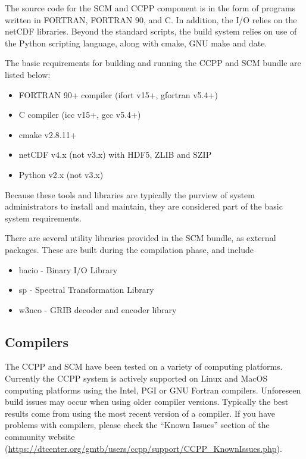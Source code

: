 The source code for the SCM and CCPP component is in the form of programs written in FORTRAN, FORTRAN 90, and C. In addition, the I/O relies on the netCDF libraries. Beyond the standard scripts, the build system relies on use of the Python scripting language, along with cmake, GNU make and date.

The basic requirements for building and running the CCPP and SCM bundle are listed below:
\begin{itemize}
    \item FORTRAN 90+ compiler (ifort v15+, gfortran v5.4+)
    \item C compiler (icc v15+, gcc v5.4+)
    \item cmake v2.8.11+
    \item netCDF v4.x (not v3.x) with HDF5, ZLIB and SZIP
    \item Python v2.x (not v3.x)
\end{itemize}

Because these tools and libraries are typically the purview of system administrators to install and maintain, they are considered  part of the basic system requirements.

There are several utility libraries provided in the SCM bundle, as external packages. These are built during the compilation phase, and include
\begin{itemize}
    \item bacio - Binary I/O Library
    \item sp - Spectral Transformation Library
    \item w3nco - GRIB decoder and encoder library
\end{itemize}

\subsection{Compilers}
The CCPP and SCM have been tested on a variety of
computing platforms. Currently the CCPP system is actively supported
on Linux and MacOS computing platforms using the Intel, PGI or GNU Fortran
compilers. Unforeseen build issues may occur when using older
compiler versions. Typically the best results come from using the
most recent version of a compiler. If you have problems with compilers, please check the ``Known Issues'' section of the
community website (\url{https://dtcenter.org/gmtb/users/ccpp/support/CCPP_KnownIssues.php}).

